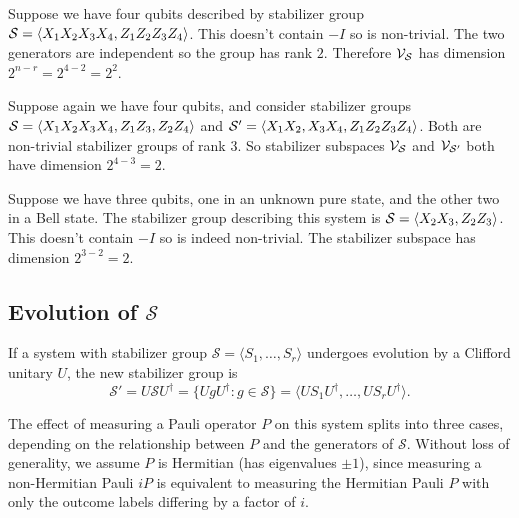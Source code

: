 \begin{example}\label{ex:422_stabilizer_group}
    Suppose we have four qubits described by stabilizer group $\mathcal{S} = \langle X_1 X_2 X_3 X_4, Z_1 Z_2 Z_3 Z_4 \rangle$.
    This doesn't contain $-I$ so is non-trivial.
    The two generators are independent so the group has rank $2$.
    Therefore $\mathcal{V}_{\mathcal{S}}$ has dimension $2^{n - r} = 2^{4 - 2} = 2^2$.
\end{example}

\begin{example}\label{ex:bacon_shor_stabilizer_group}
    Suppose again we have four qubits, and consider stabilizer groups $\mathcal{S} = \langle X_1 X_2 X_3 X_4, Z_1 Z_3, Z_2 Z_4 \rangle$ and $\mathcal{S}' = \langle X_1 X_2, X_3 X_4, Z_1 Z_2 Z_3 Z_4 \rangle$.
    Both are non-trivial stabilizer groups of rank $3$.
    So stabilizer subspaces $\mathcal{V}_{\mathcal{S}}$ and $\mathcal{V}_{\mathcal{S}'}$ both have dimension $2^{4 - 3} = 2$.
\end{example}

\begin{example}\label{ex:teleportation_stabilizer_group}
    Suppose we have three qubits, one in an unknown pure state, and the other two in a Bell state.
    The stabilizer group describing this system is $\mathcal{S} = \langle X_2 X_3, Z_2 Z_3 \rangle$.
    This doesn't contain $-I$ so is indeed non-trivial.
    The stabilizer subspace has dimension $2^{3 - 2} = 2$.
\end{example}

\subsection{Evolution of $\mathcal{S}$}

\begin{theorem}\label{thm:stabilizer_group_update_clifford}
    If a system with stabilizer group $\mathcal{S} = \langle S_1, \ldots, S_r \rangle$ undergoes evolution by a Clifford unitary $U$, the new stabilizer group is
    \begin{equation}
        \mathcal{S}' = U \mathcal{S} U^\dagger = \{ U g U^\dagger : g \in \mathcal{S} \} = \langle U S_1 U^\dagger, \ldots, U S_r U^\dagger \rangle.
    \end{equation}
\end{theorem}

The effect of measuring a Pauli operator $P$ on this system splits into three cases, depending on the relationship between $P$ and the generators of $\mathcal{S}$.
Without loss of generality, we assume $P$ is Hermitian (has eigenvalues $\pm 1$), since measuring a non-Hermitian Pauli $iP$ is equivalent to measuring the Hermitian Pauli $P$ with only the outcome labels differing by a factor of $i$.

